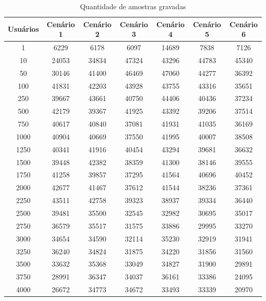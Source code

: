 \begin{table}[ht]
\centering
\caption{Quantidade de amostras gravadas}
\label{tab:am}
\begin{tabular}{|
>{\columncolor[HTML]{C0C0C0}}c |c|c|c|c|c|c|}
\hline
Usuários & \cellcolor[HTML]{C0C0C0}Cenário 1 & \cellcolor[HTML]{C0C0C0}Cenário 2 & \cellcolor[HTML]{C0C0C0}Cenário 3 & \cellcolor[HTML]{C0C0C0}Cenário 4 & \cellcolor[HTML]{C0C0C0}Cenário 5 & \cellcolor[HTML]{C0C0C0}Cenário 6 \\ \hline
1 & 6229 & 6178 & 6097 & 14689 & 7838 & 7126 \\ \hline
10 & 24053 & 34834 & 47324 & 43296 & 44783 & 45340 \\ \hline
50 & 30146 & 41400 & 46469 & 47060 & 44277 & 36392 \\ \hline
100 & 41831 & 42203 & 43928 & 43755 & 43316 & 35651 \\ \hline
250 & 39667 & 43661 & 40750 & 44406 & 40436 & 37234 \\ \hline
500 & 42179 & 39367 & 41925 & 43392 & 39206 & 37514 \\ \hline
750 & 40617 & 40840 & 37081 & 41931 & 41035 & 36169 \\ \hline
1000 & 40904 & 40669 & 37550 & 41995 & 40007 & 38508 \\ \hline
1250 & 40341 & 41916 & 40454 & 43294 & 39681 & 36632 \\ \hline
1500 & 39448 & 42382 & 38359 & 41300 & 38146 & 39555 \\ \hline
1750 & 41258 & 39857 & 37295 & 41564 & 40696 & 40452 \\ \hline
2000 & 42677 & 41467 & 37612 & 41544 & 38236 & 37361 \\ \hline
2250 & 43511 & 42758 & 39323 & 38937 & 39334 & 36440 \\ \hline
2500 & 39481 & 35500 & 32545 & 32982 & 30695 & 35017 \\ \hline
2750 & 36579 & 35517 & 31575 & 33886 & 29995 & 33270 \\ \hline
3000 & 34654 & 34590 & 32114 & 35230 & 32919 & 31941 \\ \hline
3250 & 36240 & 34824 & 31875 & 34220 & 31856 & 31560 \\ \hline
3500 & 33632 & 35368 & 33049 & 34827 & 31900 & 29891 \\ \hline
3750 & 28991 & 36347 & 34037 & 36161 & 33386 & 24095 \\ \hline
4000 & 26672 & 34773 & 34672 & 33493 & 33339 & 20970 \\ \hline
\end{tabular}
\end{table}

